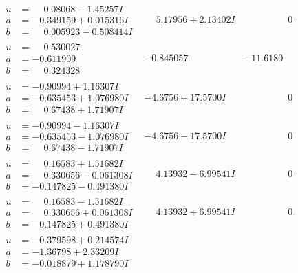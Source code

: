 \documentclass[1p]{elsarticle_modified}
\theoremstyle{definition}
\begin{document}
$$\begin{array}{c|c|c}
\begin{aligned}
u &= \phantom{-}0.08068 - 1.45257 I \\
a &= -0.349159 + 0.015316 I \\
b &= \phantom{-}0.005923 - 0.508414 I\end{aligned}
 & \phantom{-}5.17956 + 2.13402 I & \phantom{-0.000000 } 0 \\ \hline\begin{aligned}
u &= \phantom{-}0.530027\phantom{ +0.000000I} \\
a &= -0.611909\phantom{ +0.000000I} \\
b &= \phantom{-}0.324328\phantom{ +0.000000I}\end{aligned}
 & -0.845057\phantom{ +0.000000I} & -11.6180\phantom{ +0.000000I} \\ \hline\begin{aligned}
u &= -0.90994 + 1.16307 I \\
a &= -0.635453 + 1.076980 I \\
b &= \phantom{-}0.67438 + 1.71907 I\end{aligned}
 & -4.6756 + 17.5700 I & \phantom{-0.000000 } 0 \\ \hline\begin{aligned}
u &= -0.90994 - 1.16307 I \\
a &= -0.635453 - 1.076980 I \\
b &= \phantom{-}0.67438 - 1.71907 I\end{aligned}
 & -4.6756 - 17.5700 I & \phantom{-0.000000 } 0 \\ \hline\begin{aligned}
u &= \phantom{-}0.16583 + 1.51682 I \\
a &= \phantom{-}0.330656 - 0.061308 I \\
b &= -0.147825 - 0.491380 I\end{aligned}
 & \phantom{-}4.13932 - 6.99541 I & \phantom{-0.000000 } 0 \\ \hline\begin{aligned}
u &= \phantom{-}0.16583 - 1.51682 I \\
a &= \phantom{-}0.330656 + 0.061308 I \\
b &= -0.147825 + 0.491380 I\end{aligned}
 & \phantom{-}4.13932 + 6.99541 I & \phantom{-0.000000 } 0 \\ \hline\begin{aligned}
u &= -0.379598 + 0.214574 I \\
a &= -1.36798 + 2.33209 I \\
b &= -0.018879 + 1.178790 I\end{aligned}

\end{array}$$
\end{document}
